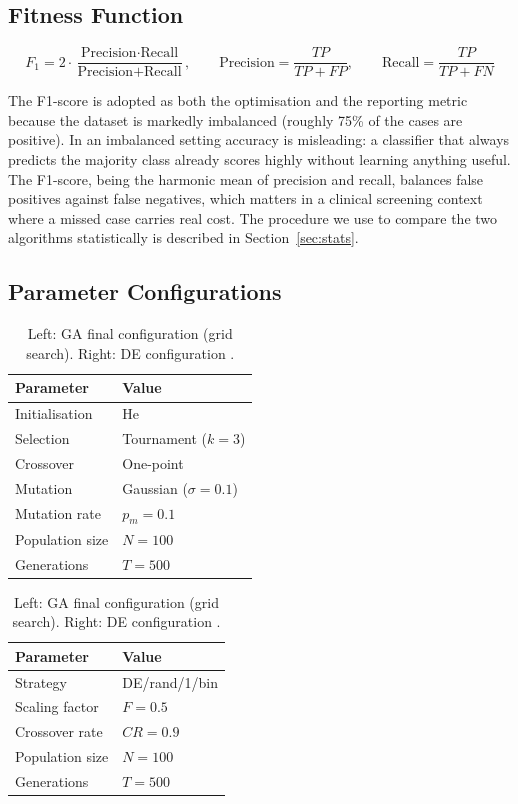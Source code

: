 \documentclass[12pt, a4paper]{article}
\newcommand{\rowhead}{\rowcolor{primary}\color{white}\bfseries}
\begin{document}
\subsection{Fitness Function}

\begin{infobox}[title=Fitness Function: F1-Score]
\[
F_1 = 2 \cdot \frac{\text{Precision} \cdot \text{Recall}}{\text{Precision} + \text{Recall}}, \qquad
\text{Precision} = \frac{TP}{TP+FP}, \qquad
\text{Recall} = \frac{TP}{TP+FN}
\]
\end{infobox}

\vspace{4pt}
The F1-score is adopted as both the optimisation and the reporting metric because the dataset is markedly imbalanced (roughly 75\% of the cases are positive). In an imbalanced setting accuracy is misleading: a classifier that always predicts the majority class already scores highly without learning anything useful. The F1-score, being the harmonic mean of precision and recall, balances false positives against false negatives, which matters in a clinical screening context where a missed case carries real cost. The procedure we use to compare the two algorithms statistically is described in Section~\ref{sec:stats}.

\subsection{Parameter Configurations}

\begin{table}[H]
\centering
\renewcommand{\arraystretch}{1.3}
\begin{tabular}{ll}
\toprule
\rowhead Parameter & \multicolumn{1}{l}{\color{white}Value} \\
\midrule
Initialisation  & He \cite{he2015} \\
Selection       & Tournament ($k=3$) \\
Crossover       & One-point \\
Mutation        & Gaussian ($\sigma=0.1$) \\
Mutation rate   & $p_m = 0.1$ \\
Population size & $N = 100$ \\
Generations     & $T = 500$ \\
\bottomrule
\end{tabular}
\quad
\begin{tabular}{ll}
\toprule
\rowhead Parameter & \multicolumn{1}{l}{\color{white}Value} \\
\midrule
Strategy        & DE/rand/1/bin \\
Scaling factor  & $F = 0.5$ \\
Crossover rate  & $CR = 0.9$ \\
Population size & $N = 100$ \\
Generations     & $T = 500$ \\
\bottomrule
\end{tabular}
\caption{Left: GA final configuration (grid search). Right: DE configuration \cite{storn1997}.}
\label{tab:params}
\end{table}
\end{document}
